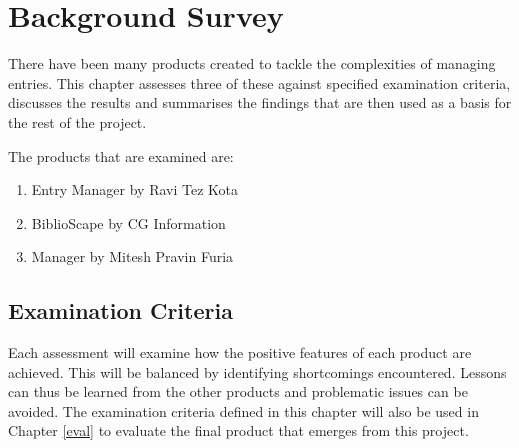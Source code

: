 \chapter{Background Survey}
\label{backgrnd}
There have been many products created to tackle the complexities of managing \bibtex{} entries.  This chapter assesses three of these against specified examination criteria, discusses the results and summarises the findings that are then used as a basis for the rest of the project.

The products that are examined are:
\begin{enumerate}
	\item \bibtex{} Entry Manager by Ravi Tez Kota
	\item BiblioScape by CG Information
	\item \bibtex{} Manager by Mitesh Pravin Furia 
\end{enumerate}

\section{Examination Criteria}
\label{examCriteria}
Each assessment will examine how the positive features of each product are achieved. This will be balanced by identifying shortcomings encountered.  Lessons can thus be learned from the other products and problematic issues can be avoided.  The examination criteria defined in this chapter will also be used in Chapter \ref{eval} to evaluate the final product that emerges from this project.

